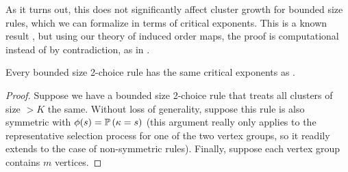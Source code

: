 \documentclass[twoside,10pt]{article}
\begin{document}
As it turns out, this does not significantly affect cluster growth for bounded size rules, which we can formalize in terms of critical exponents. This is a known result \cite{RW-bounded}, but using our theory of induced order maps, the proof is computational instead of by contradiction, as in \cite{RW-bounded}.


\begin{thrm}[]
Every bounded size 2-choice rule has the same critical exponents as \ER.
\end{thrm}
\begin{proof}
	Suppose we have a bounded size 2-choice rule that treats all clusters of size $>K$ the same. Without loss of generality, suppose this rule is also symmetric with $\phi(s) = \P{ \kappa=s }$ (this argument really only applies to the representative selection process for one of the two vertex groups, so it readily extends to the case of non-symmetric rules). Finally, suppose each vertex group contains $m$ vertices.


\end{proof}
\end{document}
